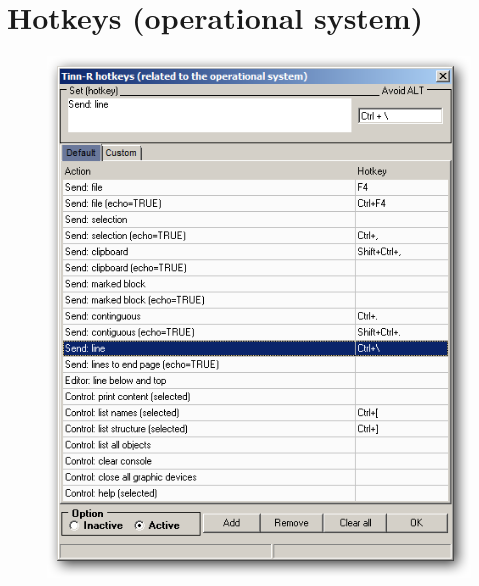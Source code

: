 
\hypertarget{working_hotkeys}{}
\section{Hotkeys (operational system)}

\begin{figure}[h!]
  \includegraphics[scale=0.35]{./res/hotkeys_default.png}~~

\end{figure}
